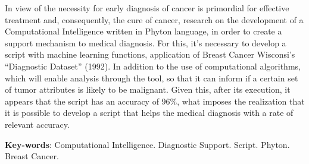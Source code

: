 In view of the necessity for early diagnosis of cancer is primordial for effective treatment and,
consequently,
the cure of cancer,
research on the development of a Computational Intelligence written in Phyton language,
in order to create a support mechanism to medical diagnosis.
For this,
it’s necessary to develop a script with machine learning functions,
application of Breast Cancer Wisconsi's “Diagnostic Dataset” (1992).
In addition to the use of computational algorithms,
which will enable analysis through the tool,
so that it can inform if a certain set of tumor attributes is likely to be malignant.
Given this, after its execution, it appears that the script has an accuracy of 96\%,
what imposes the realization that it is possible to develop a script that helps the medical diagnosis with a rate of relevant accuracy.
\vspace{\onelineskip}

\noindent
\textbf{Key-words}: Computational Intelligence. Diagnostic Support. Script. Phyton. Breast Cancer.
